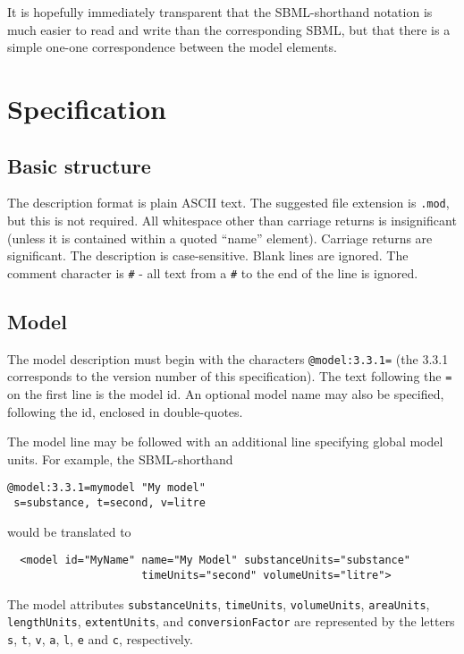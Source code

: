 \documentclass[11pt,a4paper]{article}
\begin{document}
It is hopefully immediately transparent that the SBML-shorthand
notation is much easier to read and write than the corresponding SBML,
but that there is a simple one-one correspondence between the model
elements.

\section{Specification}

\subsection{Basic structure}

The description format is plain ASCII text. The suggested file
extension is \verb$.mod$, but this is not required. All whitespace
other than carriage returns is insignificant (unless it is contained
within a quoted ``name'' element). Carriage returns are
significant. The description is case-sensitive. Blank lines are
ignored. The comment character is \verb$#$ - all text from a \verb$#$
to the end of the line is ignored.

\subsection{Model}

The model description must begin with the characters
\verb$@model:3.3.1=$ (the 3.3.1 corresponds to the version number of
this specification). The text following the \verb$=$ on the first line
is the model id. An optional model name may also be specified, following
the id, enclosed in double-quotes. 

The model line may be followed with an additional line specifying
global model units. For example, the SBML-shorthand

{\small
\begin{verbatim}
@model:3.3.1=mymodel "My model"
 s=substance, t=second, v=litre
\end{verbatim}
}

\noindent would be translated to

{\small
\begin{verbatim}
  <model id="MyName" name="My Model" substanceUnits="substance" 
                     timeUnits="second" volumeUnits="litre">
\end{verbatim}
}

The model attributes \verb$substanceUnits$, \verb$timeUnits$,
\verb$volumeUnits$, \verb$areaUnits$, \verb$lengthUnits$,
\verb$extentUnits$, and \verb$conversionFactor$ are represented by the
letters \verb$s$, \verb$t$, \verb$v$, \verb$a$, \verb$l$, \verb$e$ and
\verb$c$, respectively.
\end{document}
